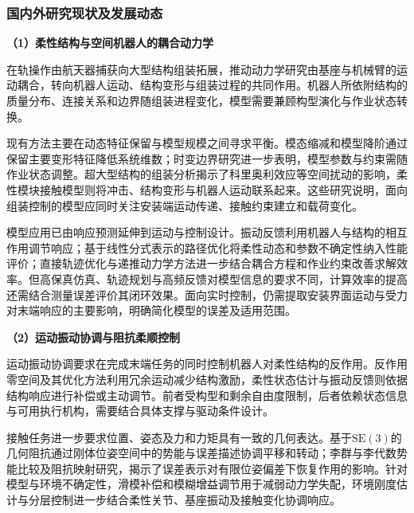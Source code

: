 \documentclass[UTF8,a4paper,zihao=-4,fontset=fandol]{ctexart}
\newcommand{\topic}[1]{\par\Needspace{4\baselineskip}\addvspace{0.5em}\noindent\textbf{#1}\par\nobreak}
\newcommand{\rev}[1]{{\color{red}#1}}
\newcommand{\SE}{\mathrm{SE}(3)}
\begin{document}
\subsubsection{国内外研究现状及发展动态}

\topic{（1）柔性结构与空间机器人的耦合动力学}

\rev{在轨}操作由航天器捕获向大型结构组装拓展，\rev{推动}动力学研究由基座与机械臂的运动耦合，转向机器人运动、结构变形与组装过程的共同作用\cite{hu2025,wu2024,papadopoulos2021}。机器人所依附\rev{结构}的质量分布、连接关系和边界随组装进程变化，模型需要\rev{兼顾}构型演化\rev{与}作业状态转换。

现有方法主要\rev{在}动态特征保留与模型规模\rev{之间寻求平衡}。模态缩减\rev{和}模型降阶通过保留主要变形特征降低系统维数\cite{sonneville2021,min2026}；时变边界研究\rev{进一步}表明，模型参数与约束\rev{需}随作业状态调整\cite{ni2024}。超大型结构的组装分析\rev{揭示了}科里奥利效应等空间扰动\rev{的}影响\cite{yang2023}，柔性模块接触\rev{模型}则将冲击、结构变形与机器人运动联系起来\cite{wucontact2026}。\rev{这些研究说明}，\rev{面向}组装\rev{控制的}模型\rev{应同时关注安装端}运动\rev{传递、}接触约束建立\rev{和}载荷\rev{变化。}

模型应用已由\rev{响应}预测\rev{延伸到}运动与控制\rev{设计}。振动反馈\rev{利用}机器人\rev{与}结构\rev{的}相互作用调节响应\cite{swei2020}；基于线性分式表示的路径优化将柔性动态\rev{和}参数不确定性纳入性能评价\cite{rodrigues2025}；直接轨迹优化\rev{与}递推动力学方法\rev{进一步结合}耦合方程\rev{和}作业约束\rev{改善}求解效率\cite{liu2026,gong2026}。但高保真仿真、轨迹规划与高频反馈对模型信息的要求\rev{不同}，计算效率的提高还需结合测量\rev{误差}评价其闭环\rev{效果}。面向实时控制，\rev{仍需}提取安装\rev{界面}运动与受力对\rev{末端}响应的主要影响，\rev{明确简化模型}的\rev{误差及适用范围}。

\topic{（2）运动振动协调与阻抗柔顺控制}

运动振动协调\rev{要求}在完成末端任务的同时控制机器人对柔性结构的反作用。反作用零空间及其优化方法利用冗余运动减少结构激励\cite{nenchev1999,yin2023}\rev{，}柔性状态估计与振动反馈则\rev{依据}结构响应进行补偿或主动调节\cite{patel2024,zhou2025}。前者受构型\rev{和}剩余自由度限制，后者依赖状态信息\rev{与}可用执行机构，需要结合具体\rev{支撑与驱动}条件\rev{设计}。

接触任务进一步\rev{要求}位置、姿态\rev{及}力和力矩具有一致的几何表达。基于$\SE$的几何阻抗\rev{通过}刚体位姿空间中\rev{的}势能\rev{与误差描述协调平移}和\rev{转动}\cite{seo2023}；李群与李代数势能比较\rev{及}阻抗映射研究，\rev{揭示了}误差表示\rev{对}有限位姿偏差下恢复作用\rev{的影响}\cite{seo2024,kim2025}。\rev{针对模型与环境不确定性，滑模补偿和模糊增益调节用于减弱动力学失配}\cite{liudb2024}\rev{，环境刚度估计与分层控制进一步结合柔性关节、基座振动及接触变化协调响应}\cite{liuadaptive2026}\rev{。}
\end{document}
